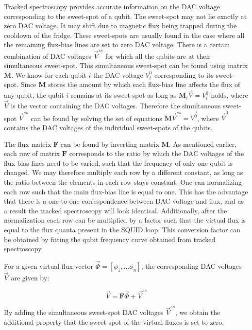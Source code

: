         Tracked spectroscopy provides accurate information on the DAC voltage corresponding to the sweet-spot of a qubit. The sweet-spot may not lie exactly at zero DAC voltage. It may shift due to magnetic flux being trapped during the cooldown of the fridge. These sweet-spots are usually found in the case where all the remaining flux-bias lines are set to zero DAC voltage. There is a certain combination of DAC voltages $\vec{V}^{ss}$ for which all the qubits are at their simultaneous sweet-spot. This simultaneous sweet-spot can be found using matrix $\boldsymbol{M}$. We know for each qubit $i$ the DAC voltage $V^0_i$ corresponding to its sweet-spot. Since $\boldsymbol{M}$ stores the amount by which each flux-bias line affects the flux of any qubit, the qubit $i$ remains at its sweet-spot as long as $\boldsymbol{M}_i \vec{V}=V^0_i$ holds, where $\vec{V}$ is the vector containing the DAC voltages. Therefore the simultaneous sweet-spot $\vec{V}^{ss}$ can be found by solving the set of equations $\boldsymbol{M} \vec{V}^{ss} = \vec{V^0}$, where $\vec{V}^0$ contains the DAC voltages of the individual sweet-spots of the qubits.

        The flux matrix $\boldsymbol{F}$ can be found by inverting matrix $\boldsymbol{M}$. As mentioned earlier, each row of matrix $\boldsymbol{F}$ corresponds to the ratio by which the DAC voltages of the flux-bias lines need to be varied, such that the frequency of only one qubit is changed. We may therefore multiply each row by a different constant, as long as the ratio between the elements in each row stays constant. One can normalizing each row such that the main flux-bias line is equal to one. This has the advantage that there is a one-to-one correspondence between DAC voltage and flux, and as a result the tracked spectroscopy will look identical. Additionally, after the normalization each row can be multiplied by a factor such that the virtual flux is equal to the flux quanta present in the SQUID loop. This conversion factor can be obtained by fitting the qubit frequency curve obtained from tracked spectroscopy.

        For a given virtual flux vector $\vec{\Phi}=\left[ \phi_1, \dots \phi_n \right]$, the corresponding DAC voltages $\vec{V}$ are given by:

        \begin{equation}
          \vec{V} = \boldsymbol{F} \vec{\Phi} + \vec{V}^{ss}
        \end{equation}

        By adding the simultaneous sweet-spot DAC voltages $\vec{V}^{ss}$, we obtain the additional property that the sweet-spot of the virtual fluxes is set to zero.

